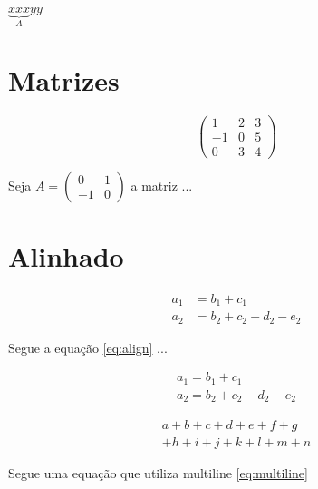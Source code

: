 \documentclass[]{article}
\begin{document}
$\underbrace{xxx}_A yy$

\section{Matrizes}

\[
\begin{pmatrix}
	1 & 2 & 3  \\
	-1 & 0 & 5 \\
	0 & 3 & 4
\end{pmatrix}
\]

Seja \( A = \left(\begin{smallmatrix} 0 & 1 \\ -1 & 0 \end{smallmatrix} \right) \) a matriz ...

\section{Alinhado}

\begin{align} 
	a_1 & = b_1 + c_1  \label{eq:align} \\
	a_2 & = b_2 + c_2 - d_2 - e_2 \nonumber
\end{align}

Segue a equação \eqref{eq:align} ...

\begin{gather} 
a_1 = b_1 + c_1  \label{eq:gather} \\
a_2 = b_2 + c_2 - d_2 - e_2 \nonumber
\end{gather}

\begin{multline} \label{eq:multiline}
	a + b + c + d + e + f + g \\
	 + h + i + j + k + l + m + n
\end{multline}

Segue uma equação que utiliza multiline \eqref{eq:multiline}
\end{document}
